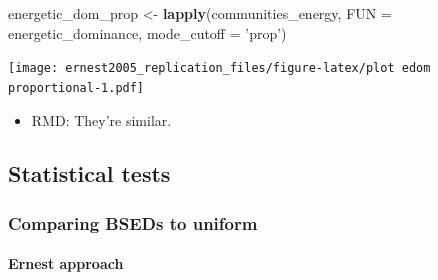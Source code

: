 \documentclass[]{article}
\newenvironment{Shaded}{\begin{snugshade}}{\end{snugshade}}
\newcommand{\KeywordTok}[1]{\textcolor[rgb]{0.13,0.29,0.53}{\textbf{#1}}}
\newcommand{\DataTypeTok}[1]{\textcolor[rgb]{0.13,0.29,0.53}{#1}}
\newcommand{\StringTok}[1]{\textcolor[rgb]{0.31,0.60,0.02}{#1}}
\newcommand{\NormalTok}[1]{#1}
\providecommand{\tightlist}{%
  \setlength{\itemsep}{0pt}\setlength{\parskip}{0pt}}
\let\oldparagraph\paragraph
\renewcommand{\paragraph}[1]{\oldparagraph{#1}\mbox{}}
\begin{document}
\begin{Shaded}
\begin{Highlighting}[]
\NormalTok{energetic_dom_prop <-}\StringTok{ }\KeywordTok{lapply}\NormalTok{(communities_energy, }\DataTypeTok{FUN =}\NormalTok{ energetic_dominance, }\DataTypeTok{mode_cutoff =} \StringTok{'prop'}\NormalTok{) }
\end{Highlighting}
\end{Shaded}

\texttt{[image: ernest2005\_replication\_files/figure-latex/plot edom proportional-1.pdf]}

\begin{itemize}
\tightlist
\item
  RMD: They're similar.
\end{itemize}

\subsection{Statistical tests}\label{statistical-tests}

\subsubsection{Comparing BSEDs to
uniform}\label{comparing-bseds-to-uniform}

\paragraph{Ernest approach}\label{ernest-approach}
\end{document}
